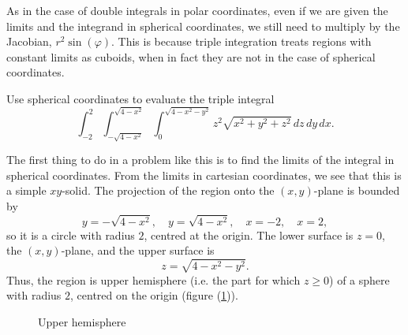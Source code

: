   As in the case of double integrals in polar coordinates, even if we are given the limits and the integrand in spherical coordinates, we still need to multiply by the Jacobian, $r^2\sin(\varphi)$.  This is because triple integration treats regions with constant limits as cuboids, when in fact they are not in the case of spherical coordinates.
  
  \begin{example}
    Use spherical coordinates to evaluate the triple integral
      \[
        \int\nolimits_{-2}^2 \int\nolimits_{-\sqrt{4 - x^2}}^{\sqrt{4 - x^2}} \int\nolimits_0^{\sqrt{4 - x^2 - y^2}} z^2\sqrt{x^2 + y^2 + z^2} \, dz \, dy \, dx.
      \]
    
    The first thing to do in a problem like this is to find the limits of the integral in spherical coordinates.  From the limits in cartesian coordinates, we see that this is a simple $xy$-solid.  The projection of the region onto the $(x, y)$-plane is bounded by
      \[
        y = -\sqrt{4 - x^2}, \quad y = \sqrt{4 - x^2}, \quad x = -2, \quad x = 2,
      \]
    so it is a circle with radius $2$, centred at the origin.  The lower surface is $z = 0$, the $(x, y)$-plane, and the upper surface is
      \[
        z = \sqrt{4 - x^2 - y^2}.
      \]
    Thus, the region is upper hemisphere (i.e. the part for which $z \geq 0$) of a sphere with radius $2$, centred on the origin (figure (\ref{hemisphere})).
    
  \begin{figure}[H]
    \centering
    \def\svgwidth{0.5\columnwidth}
    
    \caption{Upper hemisphere}
    \label{hemisphere}
  \end{figure}
    

\end{example}
